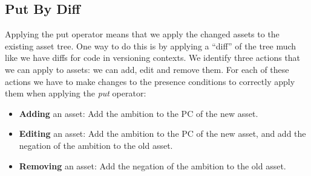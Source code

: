 \subsection*{Put By Diff}
Applying the put operator means that we apply the changed assets to the
existing asset tree. One way to do this is by applying a ``diff'' of the tree
much like we have diffs for code in versioning contexts. We identify three
actions that we can apply to assets: we can add, edit and remove them. For each
of these actions we have to make changes to the presence conditions to
correctly apply them when applying the \emph{put} operator:
\begin{itemize}
  \item \textbf{Adding} an asset: Add the ambition to the PC of the new asset.
  \item \textbf{Editing} an asset: Add the ambition to the PC of the new asset,
        and add the negation of the ambition to the old asset.
  \item \textbf{Removing} an asset: Add the negation of the ambition to the old
        asset.
\end{itemize}

